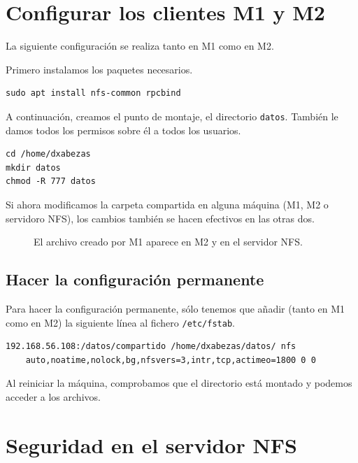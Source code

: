 \documentclass{article}
\begin{document}
\section{Configurar los clientes M1 y M2}

La siguiente configuración se realiza tanto en M1 como en M2.

Primero instalamos los paquetes necesarios.
\begin{Verbatim}
sudo apt install nfs-common rpcbind
\end{Verbatim}

A continuación, creamos el punto de montaje, el directorio \texttt{datos}. También le damos todos los permisos sobre él a todos los usuarios.
\begin{Verbatim}
cd /home/dxabezas
mkdir datos
chmod -R 777 datos
\end{Verbatim}

Si ahora modificamos la carpeta compartida en alguna máquina (M1, M2 o servidoro NFS), los cambios también se hacen efectivos en las otras dos.
\begin{figure}[H]
	\centering
	\caption{El archivo creado por M1 aparece en M2 y en el servidor NFS.}
\end{figure}

\subsection{Hacer la configuración permanente}

Para hacer la configuración permanente, sólo tenemos que añadir (tanto en M1 como en M2) la siguiente línea al fichero \texttt{/etc/fstab}.
\begin{Verbatim}[tabsize=4]
192.168.56.108:/datos/compartido /home/dxabezas/datos/ nfs
	auto,noatime,nolock,bg,nfsvers=3,intr,tcp,actimeo=1800 0 0
\end{Verbatim}
Al reiniciar la máquina, comprobamos que el directorio está montado y podemos acceder a los archivos.

\section{Seguridad en el servidor NFS}
\end{document}
